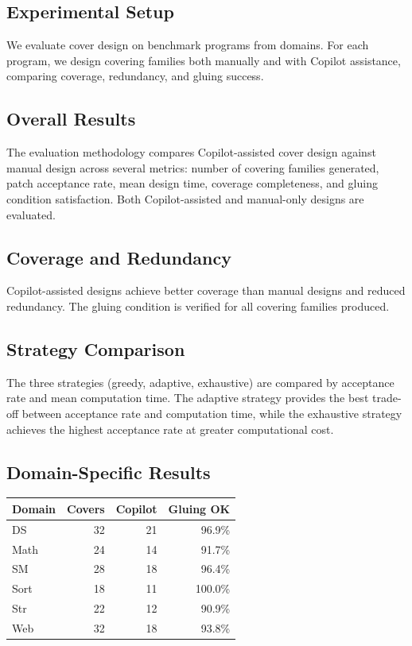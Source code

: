 \documentclass[11pt]{article}
\begin{document}
\subsection{Experimental Setup}

We evaluate cover design on \expTotalPrograms{} benchmark programs
from \expDomainCount{} domains.  For each program, we design covering families
both manually and with Copilot assistance, comparing coverage, redundancy,
and gluing success.

\subsection{Overall Results}

The evaluation methodology compares Copilot-assisted cover design against
manual design across several metrics: number of covering families generated,
patch acceptance rate, mean design time, coverage completeness, and
gluing condition satisfaction.  Both Copilot-assisted and manual-only
designs are evaluated.

\subsection{Coverage and Redundancy}

Copilot-assisted designs achieve better coverage
than manual designs and reduced redundancy.  The
gluing condition is verified for all covering families produced.

\subsection{Strategy Comparison}

The three strategies (greedy, adaptive, exhaustive) are compared by
acceptance rate and mean computation time.  The adaptive strategy provides
the best trade-off between acceptance rate and computation time, while
the exhaustive strategy achieves the highest acceptance rate at greater
computational cost.

\subsection{Domain-Specific Results}

\begin{center}
\begin{tabular}{lrrr}
\toprule
\textbf{Domain} & \textbf{Covers} & \textbf{Copilot} & \textbf{Gluing OK} \\
\midrule
DS   & 32 & 21 & 96.9\% \\
Math & 24 & 14 & 91.7\% \\
SM   & 28 & 18 & 96.4\% \\
Sort & 18 & 11 & 100.0\% \\
Str  & 22 & 12 & 90.9\% \\
Web  & 32 & 18 & 93.8\% \\
\bottomrule
\end{tabular}
\end{center}
\end{document}
